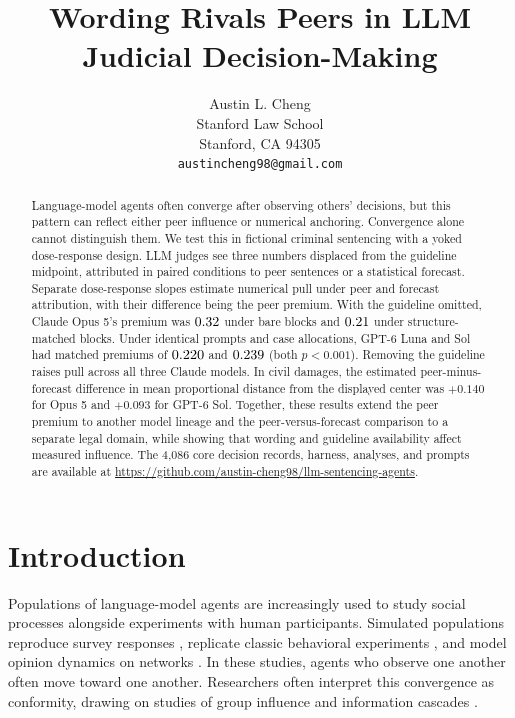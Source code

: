 \documentclass{article}
\title{Wording Rivals Peers in LLM Judicial Decision-Making}
\author{%
  Austin L. Cheng \\
  Stanford Law School \\
  Stanford, CA 94305 \\
  \texttt{austincheng98@gmail.com} \\
}
\begin{document}
\maketitle
\raggedbottom

\begin{abstract}
Language-model agents often converge after observing others' decisions, but this pattern can reflect either
peer influence or numerical anchoring. Convergence alone cannot distinguish them. We test this in fictional
criminal sentencing with a yoked dose-response design. LLM judges see three numbers displaced from the
guideline midpoint, attributed in paired conditions to peer sentences or a statistical forecast. Separate
dose-response slopes estimate numerical pull under peer and forecast attribution, with their difference
being the peer premium. With the guideline omitted, Claude Opus 5's premium was $0.32$ under bare blocks
and $0.21$ under structure-matched blocks. Under identical prompts and case allocations, GPT-6 Luna and Sol
had matched premiums of $0.220$ and $0.239$ (both $p<0.001$). Removing the guideline raises pull
across all three Claude models. In civil damages, the estimated peer-minus-forecast difference in mean
proportional distance from the displayed center was $+0.140$ for Opus 5 and $+0.093$ for GPT-6 Sol.
Together, these results extend the peer premium to another model lineage and the peer-versus-forecast
comparison to a separate legal domain, while showing that wording and guideline availability affect measured
influence. The 4,086 core decision records, harness, analyses, and prompts are available at
\url{https://github.com/austin-cheng98/llm-sentencing-agents}.
\end{abstract}

\section{Introduction}

Populations of language-model agents are increasingly used to study social processes alongside
experiments with human participants. Simulated populations reproduce survey responses
\citep{argyle2023out,park2024thousand}, replicate classic behavioral experiments
\citep{aher2023using,horton2023large}, and model opinion dynamics on networks
\citep{chuang2024simulating}. In these studies, agents who observe one another often move toward one
another. Researchers often interpret this convergence as conformity, drawing on studies of group
influence \citep{asch1956independence,sherif1935study} and information cascades
\citep{bikhchandani1992theory,anderson1997information}.
\end{document}
